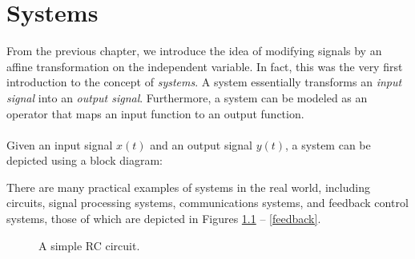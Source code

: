 \documentclass{report}
\begin{document}
\setcounter{chapter}{1}
\setcounter{page}{19}
\chapter{Systems}
From the previous chapter, we introduce the idea of modifying signals by an affine transformation on the independent variable. 
In fact, this was the very first introduction to the concept of \emph{systems}. A system essentially transforms an \emph{input signal} 
into an \emph{output signal}. Furthermore, a system can be modeled as an operator that maps an input function to an output function.
\\ \\
Given an input signal $x(t)$ and an output signal $y(t)$, a system can be depicted using a block diagram:

\begin{center}
\end{center}

There are many practical examples of systems in the real world, including circuits, signal processing systems, 
communications systems, and feedback control systems, those of which are depicted in Figures \ref{RC_circuit} -- \ref{feedback}.

\begin{figure}[!hbt]
    \caption{A simple RC circuit.}
    \label{RC_circuit}
    \centering
\end{figure}
\end{document}
